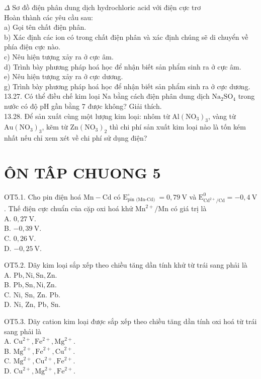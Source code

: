 \documentclass[10pt]{article}
\begin{document}
$\Delta$ Sơ đồ điện phân dung dịch hydrochloric acid với điện cực trơ\\
Hoàn thành các yêu cầu sau:\\
a) Gọi tên chất điện phân.\\
b) Xác định các ion có trong chất điện phân và xác định chúng sẽ di chuyển về phía điện cực nào.\\
c) Nêu hiện tượng xảy ra ở cực âm.\\
d) Trình bày phương pháp hoá học để nhận biết sản phẩm sinh ra ở cực âm.\\
e) Nêu hiện tượng xảy ra ở cực dương.\\
g) Trình bày phương pháp hoá học để nhận biết sản phẩm sinh ra ở cực dương.\\
13.27. Có thể điều chế kim loại Na bằng cách điện phân dung dịch $\mathrm{Na}_{2} \mathrm{SO}_{4}$ trong nước có độ pH gần bằng 7 được không? Giải thích.\\
13.28. Để sản xuất cùng một lượng kim loại: nhôm từ $\mathrm{Al}\left(\mathrm{NO}_{3}\right)_{3}$, vàng từ $\mathrm{Au}\left(\mathrm{NO}_{3}\right)_{3}$, kẽm từ $\mathrm{Zn}\left(\mathrm{NO}_{3}\right)_{2}$ thì chi phí sản xuất kim loại nào là tốn kém nhất nếu chỉ xem xét về chi phí sử dụng điện?

\section*{ÔN TÂP CHUONG 5}
OT5.1. Cho pin điện hoá $\mathrm{Mn}-\mathrm{Cd}$ có $\mathrm{E}_{\text {pin (Mn-Cd) }}^{\circ}=0,79 \mathrm{~V}$ và $\mathrm{E}_{\mathrm{Cd}^{2+} / \mathrm{Cd}}^{0}=-0,4 \mathrm{~V}$. Thế điện cực chuẩn của cặp oxi hoá khử $\mathrm{Mn}^{2+} / \mathrm{Mn}$ có giá trị là\\
A. $0,27 \mathrm{~V}$.\\
B. $-0,39 \mathrm{~V}$.\\
C. $0,26 \mathrm{~V}$.\\
D. $-0,25 \mathrm{~V}$.

OT5.2. Dãy kim loại sắp xếp theo chiều tăng dần tính khử từ trái sang phải là\\
A. $\mathrm{Pb}, \mathrm{Ni}, \mathrm{Sn}, \mathrm{Zn}$.\\
B. $\mathrm{Pb}, \mathrm{Sn}, \mathrm{Ni}, \mathrm{Zn}$.\\
C. Ni, Sn, Zn. Pb.\\
D. Ni, Zn, Pb, Sn.

OT5.3. Dãy cation kim loại được sắp xếp theo chiều tăng dần tính oxi hoá từ trái sang phải là\\
A. $\mathrm{Cu}^{2+}, \mathrm{Fe}^{2+}, \mathrm{Mg}^{2+}$.\\
B. $\mathrm{Mg}^{2+}, \mathrm{Fe}^{2+}, \mathrm{Cu}^{2+}$.\\
C. $\mathrm{Mg}^{2+}, \mathrm{Cu}^{2+}, \mathrm{Fe}^{2+}$.\\
D. $\mathrm{Cu}^{2+}, \mathrm{Mg}^{2+}, \mathrm{Fe}^{2+}$.
\end{document}
